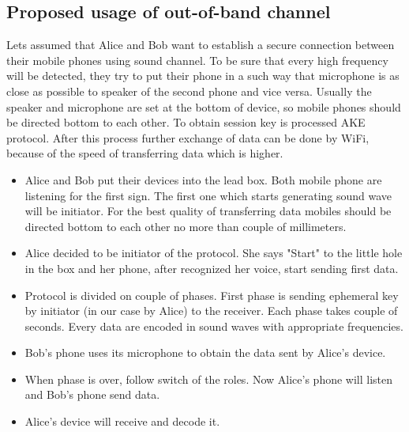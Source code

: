 \documentclass[11pt,titlepage]{article}
\theoremstyle{plain}
\begin{document}

\subsection{Proposed usage of out-of-band channel}

Lets assumed that Alice and Bob want to establish a secure connection between their mobile phones using sound channel. To be sure that every high frequency will be detected, they try to put their phone in a such way that microphone is as close as possible to speaker of the second phone and vice versa. Usually the speaker and microphone are set at the bottom of device, so mobile phones should be directed bottom to each other. To obtain session key is processed AKE protocol. After this process further exchange of data can be done by WiFi, because of the speed of transferring data which is higher. 

\vspace{5mm}

\begin{itemize}
	\item Alice and Bob put their devices into the lead box. Both mobile phone are listening for the first sign. The first one which starts generating sound wave will be initiator. For the best quality of transferring data mobiles should be directed bottom to each other no more than couple of millimeters.
	\item Alice decided to be initiator of the protocol. She says "Start" to the little hole in the box and her phone, after recognized her voice, start sending first data.
	\item Protocol is divided on couple of phases. First phase is sending ephemeral key by initiator (in our case by Alice) to the receiver. Each phase takes couple of seconds. Every data are encoded in sound waves with appropriate frequencies.
	\item Bob's phone uses its microphone to obtain the data sent by Alice's device.
	\item When phase is over, follow switch of the roles. Now Alice's phone will listen and Bob's phone send data.
	\item Alice's device will receive and decode it.
\end{itemize}
\end{document}
